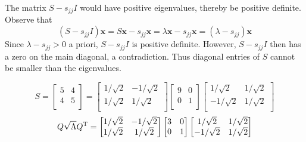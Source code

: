 \documentclass[a4paper]{article}
\begin{document}
The matrix \(S - s_{jj}I\) would have positive eigenvalues, thereby be positive definite. Observe that
\[
	\!\left( S - s_{jj}I \right) \bm{x} = S \bm{x} - s_{jj}\bm{x} = \lambda \bm{x} - s_{jj}\bm{x} = \!\left( \lambda - s_{jj} \right) \bm{x} 
\]
Since \(\lambda - s_{jj} > 0\) a priori, \(S - s_{jj}I\) is positive definite. However, \(S - s_{jj}I\) then has a zero on the main diagonal, a contradiction. Thus diagonal entries of \(S\) cannot be smaller than the eigenvalues.

\vspace{12pt}

\[
	S = 
	\begin{bmatrix}
		5 & 4 \\
		4 & 5 \\
	\end{bmatrix}
	=
	\begin{bmatrix}
		1/\sqrt{2} & -1/\sqrt{2} \\
		1/\sqrt{2} & 1/\sqrt{2} \\
	\end{bmatrix}
	\begin{bmatrix}
		9 & 0 \\
		0 & 1 \\
	\end{bmatrix}
	\begin{bmatrix}
		1/\sqrt{2} & 1/\sqrt{2} \\
		-1/\sqrt{2} & 1/\sqrt{2} \\
	\end{bmatrix}
\]
\[
	Q \sqrt{\Lambda}Q^{\textsc{T}} =
	\begin{bmatrix}
		1/\sqrt{2} & -1/\sqrt{2} \\
		1/\sqrt{2} & 1/\sqrt{2} \\
	\end{bmatrix}
	\begin{bmatrix}
		3 & 0 \\
		0 & 1 \\
	\end{bmatrix}
	\begin{bmatrix}
		1/\sqrt{2} & 1/\sqrt{2} \\
		-1/\sqrt{2} & 1/\sqrt{2} \\
	\end{bmatrix}
\]
\end{document}
